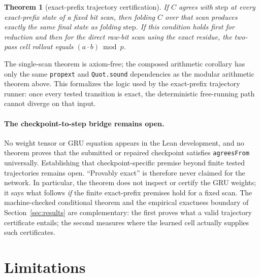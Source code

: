\documentclass[11pt]{article}
\newtheorem{theorem}{Theorem}
\begin{document}
\begin{theorem}[exact-prefix trajectory certification]
If $C$ agrees with $\mathrm{step}$ at every exact-prefix state of a fixed bit
scan, then folding $C$ over that scan produces exactly the same final state as
folding $\mathrm{step}$. If this condition holds first for reduction and then
for the direct raw-bit scan using the exact residue, the two-pass cell rollout
equals $(a\cdot b)\bmod p$.
\end{theorem}

The single-scan theorem is axiom-free; the composed arithmetic corollary has
only the same \texttt{propext} and \texttt{Quot.sound} dependencies as the
modular arithmetic theorem above. This formalizes the logic used by the
exact-prefix trajectory runner: once every tested transition is exact, the
deterministic free-running path cannot diverge on that input.

\paragraph{The checkpoint-to-step bridge remains open.}
No weight tensor or GRU equation appears in the Lean development, and no theorem
proves that the submitted or repaired checkpoint satisfies
\texttt{agreesFrom} universally. Establishing that checkpoint-specific premise
beyond finite tested trajectories remains open. ``Provably exact'' is therefore
never claimed for the network. In particular, the theorem does not inspect or
certify the GRU weights; it says what follows \emph{if} the finite exact-prefix
premises hold for a fixed scan. The machine-checked conditional theorem and the
empirical exactness boundary of Section~\ref{sec:results} are complementary: the
first proves what a valid trajectory certificate entails; the second measures
where the learned cell actually supplies such certificates.

\section{Limitations}
\label{sec:limitations}
\end{document}
